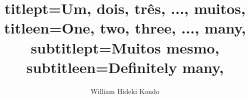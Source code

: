 

\title{
    titlept={Um, dois, três, ..., muitos},
    titleen={One, two, three, ..., many},
    subtitlept={Muitos mesmo},
    subtitleen={Definitely many},
}

\author{William Hideki Kondo}

